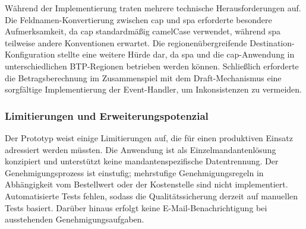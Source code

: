 Während der Implementierung traten mehrere technische Herausforderungen auf. Die Feldnamen-Konvertierung zwischen \gls{cap} und \gls{spa} erforderte besondere Aufmerksamkeit, da \gls{cap} standardmäßig camelCase verwendet, während \gls{spa} teilweise andere Konventionen erwartet. Die regionenübergreifende Destination-Konfiguration stellte eine weitere Hürde dar, da \gls{spa} und die \gls{cap}-Anwendung in unterschiedlichen BTP-Regionen betrieben werden können. Schließlich erforderte die Betragsberechnung im Zusammenspiel mit dem Draft-Mechanismus eine sorgfältige Implementierung der Event-Handler, um Inkonsistenzen zu vermeiden.

\subsubsection{Limitierungen und Erweiterungspotenzial}

Der Prototyp weist einige Limitierungen auf, die für einen produktiven Einsatz adressiert werden müssten. Die Anwendung ist als Einzelmandantenlösung konzipiert und unterstützt keine mandantenspezifische Datentrennung. Der Genehmigungsprozess ist einstufig; mehrstufige Genehmigungsregeln in Abhängigkeit vom Bestellwert oder der Kostenstelle sind nicht implementiert. Automatisierte Tests fehlen, sodass die Qualitätssicherung derzeit auf manuellen Tests basiert. Darüber hinaus erfolgt keine E-Mail-Benachrichtigung bei ausstehenden Genehmigungsaufgaben.
